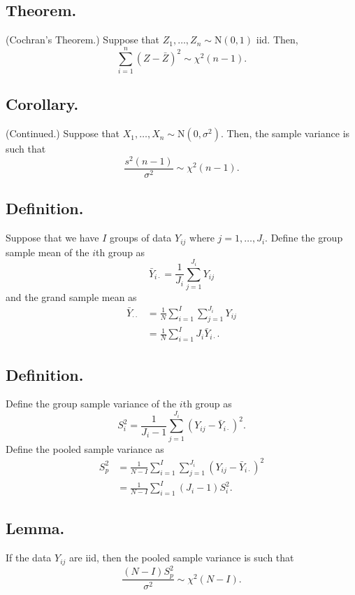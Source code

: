 \documentclass[titlepage]{article}
\begin{document}
\subsection{Theorem.} (Cochran's Theorem.) Suppose that $Z_{1}, \ldots, Z_{n} \sim \text{N}(0, 1)$ iid. Then,
$$\sum_{i=1}^{n}(Z-\bar{Z})^{2} \sim \chi^{2}(n-1).$$

\subsection{Corollary.} (Continued.) Suppose that $X_{1}, \ldots, X_{n} \sim \text{N}(0, \sigma^{2})$. Then, the sample variance is such that 
$$\frac{s^{2}(n-1)}{\sigma^{2}} \sim \chi^{2}(n-1).$$

\subsection{Definition.} Suppose that we have $I$ groups of data $Y_{ij}$ where $j = 1, \ldots, J_{i}$. Define the group sample mean of the $i$th group as 
$$\bar{Y}_{i\cdot} = \frac{1}{J_{i}}\sum_{j=1}^{J_{i}}Y_{ij}$$
and the grand sample mean as 
\begin{align*}
    \bar{Y}_{\cdot\cdot} &= \frac{1}{N}\sum_{i=1}^{I}\sum_{j=1}^{J_{i}}Y_{ij} \\
                         &= \frac{1}{N}\sum_{i=1}^{I}J_{i}\bar{Y}_{i\cdot}.
\end{align*}

\subsection{Definition.} Define the group sample variance of the $i$th group as 
$$S_{i}^{2} = \frac{1}{J_{i}-1}\sum_{j=1}^{J_{i}}(Y_{ij} - \bar{Y}_{i\cdot})^{2}.$$
Define the pooled sample variance as 
\begin{align*}
    S_{p}^{2} &= \frac{1}{N-I}\sum_{i=1}^{I}\sum_{j=1}^{J_{i}}(Y_{ij} - \bar{Y}_{i\cdot})^{2} \\
              &= \frac{1}{N-I}\sum_{i=1}^{I}(J_{i}-1)S_{i}^{2}.
\end{align*}

\subsection{Lemma.} If the data $Y_{ij}$ are iid, then the pooled sample variance is such that 
$$\frac{(N-I)S_{p}^{2}}{\sigma^{2}} \sim \chi^{2}(N-I).$$
\end{document}
